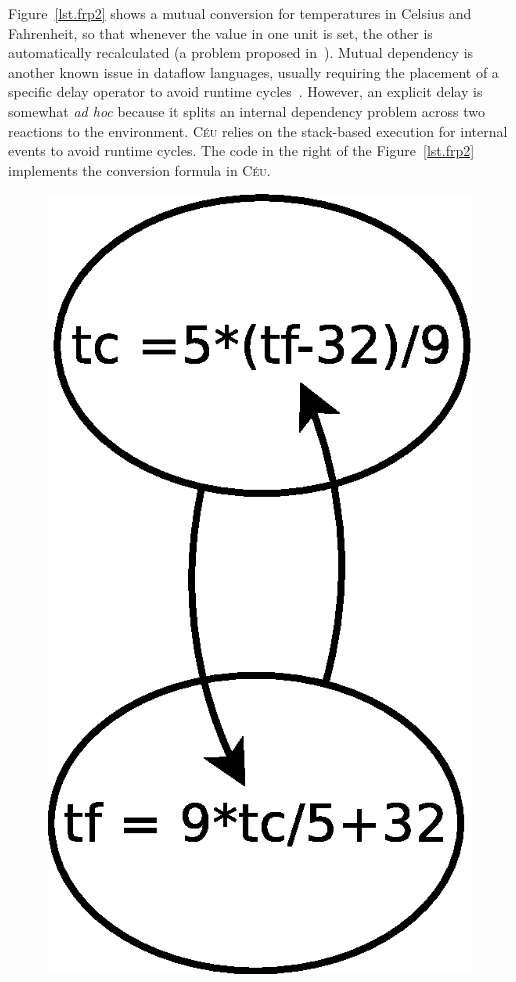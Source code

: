 \documentclass{acm_proc_article-sp}
\newcommand{\CEU}{\textsc{C\'{e}u}\xspace}
\newcommand{\1}{\;}
\newcommand{\2}{\;\;}
\newcommand{\3}{\;\;\;}
\newcommand{\5}{\;\;\;\;\;}
\begin{document}
Figure~\ref{lst.frp2} shows a mutual conversion for temperatures in Celsius and 
Fahrenheit, so that whenever the value in one unit is set, the other is 
automatically recalculated (a problem proposed in~\cite{frp.survey}).
%
Mutual dependency is another known issue in dataflow languages, usually 
requiring the placement of a specific delay operator to avoid runtime
cycles~\cite{frtime.embedding,luagravity.sblp}.
%
However, an explicit delay is somewhat \emph{ad hoc} because it splits an 
internal dependency problem across two reactions to the environment.
%
\CEU relies on the stack-based execution for internal events to avoid runtime 
cycles.
%
The code in the right of the Figure~\ref{lst.frp2} implements the conversion 
formula in \CEU.
%
\begin{figure}[t]
\begin{minipage}[t]{0.22\linewidth}
\vspace{15pt}
\hspace{0.0cm}
\includegraphics[width=\textwidth]{c2f}

\end{minipage}
\end{figure}
\end{document}

